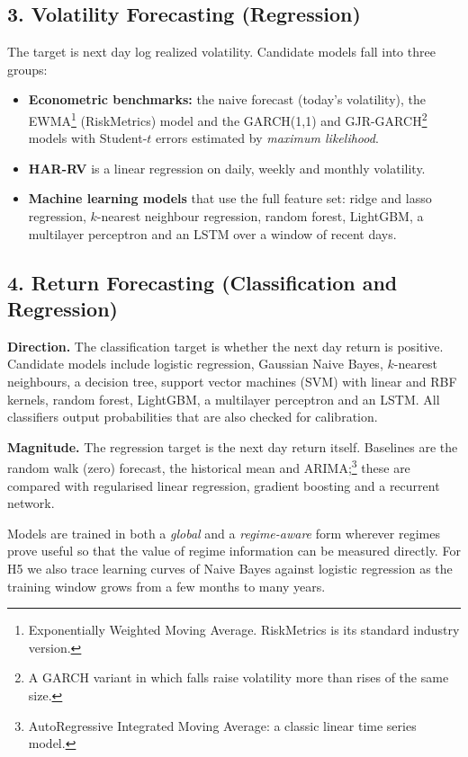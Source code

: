 \documentclass[11pt,a4paper]{article}
\begin{document}
\subsection*{3. Volatility Forecasting (Regression)}
The target is next day log realized volatility. Candidate models fall into three groups:
\begin{itemize}
  \item \textbf{Econometric benchmarks:} the naive forecast (today's volatility), the EWMA\footnote{Exponentially Weighted Moving Average. RiskMetrics is its standard industry version.} (RiskMetrics) model and the GARCH(1,1) and GJR-GARCH\footnote{A GARCH variant in which falls raise volatility more than rises of the same size.} models with Student-$t$ errors estimated by \emph{maximum likelihood}.
  \item \textbf{HAR-RV} is a linear regression on daily, weekly and monthly volatility.
  \item \textbf{Machine learning models} that use the full feature set: ridge and lasso regression, $k$-nearest
        neighbour regression, random forest, LightGBM, a multilayer perceptron and an LSTM over a window of recent days.
\end{itemize}

\subsection*{4. Return Forecasting (Classification and Regression)}
\textbf{Direction.} The classification target is whether the next day return is positive. Candidate models
include logistic regression, Gaussian Naive Bayes, $k$-nearest neighbours, a decision tree, support vector machines (SVM) with linear and RBF kernels, random forest, LightGBM, a multilayer perceptron and an LSTM. All classifiers output probabilities that are also checked for calibration.

\textbf{Magnitude.} The regression target is the next day return itself. Baselines are the random walk (zero) forecast, the historical mean and ARIMA;\footnote{AutoRegressive Integrated Moving Average: a classic linear time series model.} these are compared with regularised linear regression, gradient boosting and a
recurrent network.

Models are trained in both a \emph{global} and a \emph{regime-aware} form wherever regimes prove useful so that the value of regime information can be measured directly. For H5 we also trace learning curves of Naive Bayes against logistic
regression as the training window grows from a few months to many years.
\end{document}
